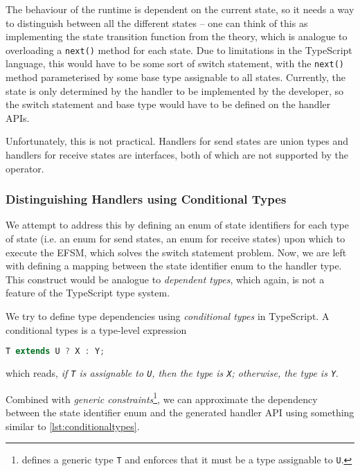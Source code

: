 The behaviour of the runtime is dependent on the current state,
so it needs a way to distinguish between
all the different states -- one can think of this as implementing
the state transition function from the theory, which is analogue to 
overloading a \texttt{next()} method for each state.
Due to limitations in the TypeScript language, this would have to
be some sort of switch statement, with the \texttt{next()}
method parameterised by some base type assignable to all states.
Currently, the state is only determined by the handler
to be implemented by the developer, so the switch statement
and base type would have to be defined on the handler APIs.

Unfortunately, this is not practical. 
Handlers for send states are union types and
handlers for receive states are interfaces,
both of which are not supported 
by the 
operator.

\subsubsection{Distinguishing Handlers using Conditional Types}

We attempt to address this by defining an enum of state identifiers
for each type of state (i.e. an enum for send states, 
an enum for receive states)
upon which to execute the EFSM, which solves the switch statement
problem.
Now, we are left with defining a mapping between the 
state identifier enum to the handler type. This construct would be
analogue to \textit{dependent types}, which again, is not a feature
of the TypeScript type system.

We try to define type dependencies using
\textit{conditional types} in TypeScript.
A conditional types is a type-level expression
\begin{lstlisting}[language=javascript,numbers=none]
T extends U ? X : Y;
\end{lstlisting}
which reads, \textit{if \texttt{T} is assignable to \texttt{U},
then the type is \texttt{X}; otherwise, the type is \texttt{Y}}.

Combined with \textit{generic constraints}\footnote{
 defines a generic type \texttt{T}
and enforces that it must be a type assignable to \texttt{U}.
},
we can approximate the dependency between the state identifier
enum and the generated handler API using something
similar to \cref{lst:conditionaltypes}.

